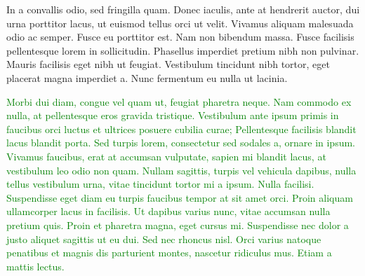 \documentclass[12pt]{article}
\begin{document}
In a convallis odio, sed fringilla quam. Donec iaculis, ante at hendrerit auctor, dui urna porttitor lacus, ut euismod tellus orci ut velit. Vivamus aliquam malesuada odio ac semper. Fusce eu porttitor est. Nam non bibendum massa. Fusce facilisis pellentesque lorem in sollicitudin. Phasellus imperdiet pretium nibh non pulvinar. Mauris facilisis eget nibh ut feugiat. Vestibulum tincidunt nibh tortor, eget placerat magna imperdiet a. Nunc fermentum eu nulla ut lacinia.

\textcolor{green}{Morbi dui diam, congue vel quam ut, feugiat pharetra neque. Nam commodo ex nulla, at pellentesque eros gravida tristique. Vestibulum ante ipsum primis in faucibus orci luctus et ultrices posuere cubilia curae; Pellentesque facilisis blandit lacus blandit porta. Sed turpis lorem, consectetur sed sodales a, ornare in ipsum. Vivamus faucibus, erat at accumsan vulputate, sapien mi blandit lacus, at vestibulum leo odio non quam. Nullam sagittis, turpis vel vehicula dapibus, nulla tellus vestibulum urna, vitae tincidunt tortor mi a ipsum. Nulla facilisi. Suspendisse eget diam eu turpis faucibus tempor at sit amet orci. Proin aliquam ullamcorper lacus in facilisis. Ut dapibus varius nunc, vitae accumsan nulla pretium quis. Proin et pharetra magna, eget cursus mi. Suspendisse nec dolor a justo aliquet sagittis ut eu dui. Sed nec rhoncus nisl. Orci varius natoque penatibus et magnis dis parturient montes, nascetur ridiculus mus. Etiam a mattis lectus.}
\end{document}
